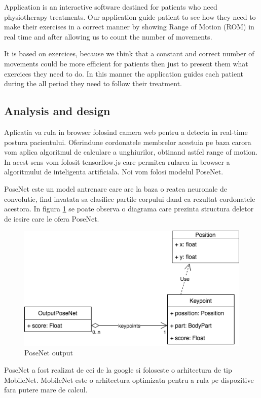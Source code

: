 Application is an interactive software destined for patients who need physiotherapy
treatments. Our application guide patient to see how they need to make their exercises in 
a correct manner by showing Range of Motion (ROM) in real time and after allowing us to 
 count the number of movements. 
 
It is based on exercices, because we think that a constant and correct number of movements could be more efficient for patients then just to present them what exercices they need to do. In this manner the application guides each patient during the all period they need to follow their treatment. 

\subsection{Analysis and design}

Aplicatia va rula in browser folosind camera web pentru a detecta in real-time postura pacientului.
Oferindune cordonatele membrelor acestuia pe baza carora vom aplica algoritmul de calculare a unghiurilor, obtinand astfel range of motion. 
In acest sens vom folosit tensorflow.js care permitea rularea in browser a algoritmului de inteligenta artificiala.
Noi vom folosi modelul PoseNet.

PoseNet este un model antrenare care are la baza o reatea neuronale de convolutie, find invatata sa clasifice partile corpului dand ca rezultat cordonatele acestora. In figura \ref{fig:uml-posenet} se poate observa o diagrama care prezinta structura deletor de iesire care le ofera PoseNet.

 \begin{figure}[htbp]
	\centerline{\includegraphics[scale=0.7]{fig/uml-posenet.png}}  
	\caption{PoseNet output}
	\label{fig:uml-posenet}
\end{figure}

PoseNet a fost realizat de cei de la google si foloseste o arhitectura de tip MobileNet.
MobileNet este o arhitectura optimizata pentru a rula pe dispozitive fara putere mare de calcul.
 
